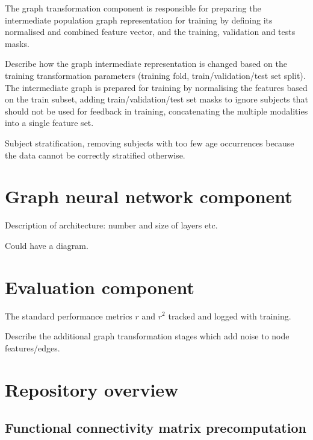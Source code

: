 The graph transformation component is responsible for preparing the intermediate population graph representation for training by defining its normalised and combined feature vector, and the training, validation and tests masks.



Describe how the graph intermediate representation is changed based on the training transformation parameters (training fold, train/validation/test set split). The intermediate graph is prepared for training by normalising the features based on the train subset, adding train/validation/test set masks to ignore subjects that should not be used for feedback in training, concatenating the multiple modalities into a single feature set.

Subject stratification, removing subjects with too few age occurrences because the data cannot be correctly stratified otherwise.


\section{Graph neural network component}
Description of architecture: number and size of layers etc.

Could have a diagram.


\section{Evaluation component}
The standard performance metrics $r$ and $r^2$ tracked and logged with training.

Describe the additional graph transformation stages which add noise to node features/edges.


\section{Repository overview}


\newpage




\subsection{Functional connectivity matrix precomputation}

